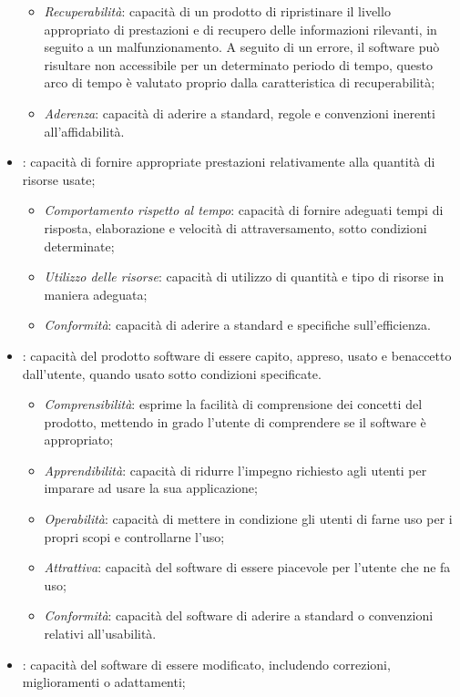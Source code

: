 \begin{itemize}
\begin{itemize}
\item \emph{Recuperabilità}: capacità di un prodotto di ripristinare il livello appropriato di prestazioni e di recupero delle informazioni rilevanti, in seguito a un malfunzionamento. A seguito di un errore, il software può risultare non accessibile per un determinato periodo di tempo, questo arco di tempo è valutato proprio dalla caratteristica di recuperabilità;
\item \emph{Aderenza}: capacità di aderire a standard, regole e convenzioni inerenti all'affidabilità.
\end{itemize}
\item {}: capacità di fornire appropriate prestazioni relativamente alla quantità di risorse usate;
\begin{itemize}
\item \emph{Comportamento rispetto al tempo}: capacità di fornire adeguati tempi di risposta, elaborazione e velocità di attraversamento, sotto condizioni determinate;
\item \emph{Utilizzo delle risorse}: capacità di utilizzo di quantità e tipo di risorse in maniera adeguata;
\item \emph{Conformità}: capacità di aderire a standard e specifiche sull'efficienza.
\end{itemize}
\item {}: capacità del prodotto software di essere capito, appreso, usato e benaccetto dall'utente, quando usato sotto condizioni specificate.
\begin{itemize}
\item \emph{Comprensibilità}: esprime la facilità di comprensione dei concetti del prodotto, mettendo in grado l'utente di comprendere se il software è appropriato;
\item \emph{Apprendibilità}: capacità di ridurre l'impegno richiesto agli utenti per imparare ad usare la sua applicazione;
\item \emph{Operabilità}: capacità di mettere in condizione gli utenti di farne uso per i propri scopi e controllarne l'uso;
\item \emph{Attrattiva}: capacità del software di essere piacevole per l'utente che ne fa uso;
\item \emph{Conformità}: capacità del software di aderire a standard o convenzioni relativi all'usabilità.
\end{itemize}
\item {}: capacità del software di essere modificato, includendo correzioni, miglioramenti o adattamenti;

\end{itemize}
